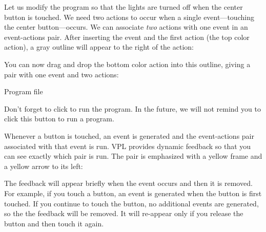 
Let us modify the program so that the lights are turned off when the
center button is touched. We need two actions to occur when a single
event---touching the center button---occurs. We can associate \emph{two}
actions with one event in an event-actions pair. After inserting the
event and the first action (the top color action), a gray outline will
appear to the right of the action:


You can now drag and drop the bottom color action into this outline,
giving a pair with one event and two actions:\label{p.multiple}


{\raggedleft \hfill Program file }

Don't forget to click  to run the program. In the
future, we will not remind you to click this button to run a program.

\bigskip


\label{p.feedback}

Whenever a button is touched, an event is generated and the event-actions pair associated with that event is run. VPL provides dynamic feedback so that you can see exactly which pair is run. The pair is emphasized with a yellow frame and a yellow arrow to its left:


The feedback will appear briefly when the event occurs and then it is removed. For example, if you touch a button, an event is generated when the button is first touched. If you continue to touch the button, no additional events are generated, so the the feedback will be removed. It will re-appear only if you release the button and then touch it again.
